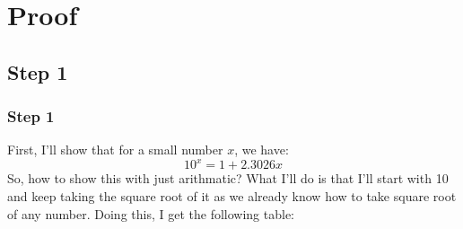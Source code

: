 \documentclass{beamer}
\begin{document}
\section{Proof}
\subsection{Step 1}
\begin{frame}
\frametitle{Step 1}
First, I'll show that for a small number $x$, we have:
\begin{equation}
    \label{eq:2}
    10^x = 1 + 2.3026x
\end{equation}
So, how to show this with just arithmatic? What I'll do is that I'll start with 10 and keep taking the square root of it as we already know how to take square root of any number.
Doing this, I get the following table:
\end{frame}
   
\end{document}
